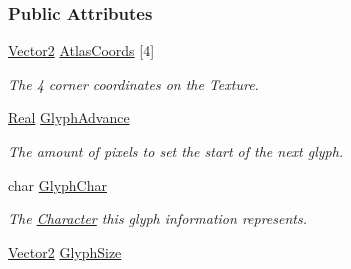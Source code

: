 \subsubsection*{Public Attributes}
\begin{DoxyCompactItemize}
\item 
\hypertarget{classMezzanine_1_1UI_1_1Glyph_ad4c8240173295f6ebb23dcab2c04ea94}{
\hyperlink{classMezzanine_1_1Vector2}{Vector2} \hyperlink{classMezzanine_1_1UI_1_1Glyph_ad4c8240173295f6ebb23dcab2c04ea94}{AtlasCoords} \mbox{[}4\mbox{]}}
\label{classMezzanine_1_1UI_1_1Glyph_ad4c8240173295f6ebb23dcab2c04ea94}

\begin{DoxyCompactList}\small\item\em The 4 corner coordinates on the Texture. \item\end{DoxyCompactList}\item 
\hypertarget{classMezzanine_1_1UI_1_1Glyph_a5bca9d6333cf67a842546475f350a4ec}{
\hyperlink{namespaceMezzanine_a726731b1a7df72bf3583e4a97282c6f6}{Real} \hyperlink{classMezzanine_1_1UI_1_1Glyph_a5bca9d6333cf67a842546475f350a4ec}{GlyphAdvance}}
\label{classMezzanine_1_1UI_1_1Glyph_a5bca9d6333cf67a842546475f350a4ec}

\begin{DoxyCompactList}\small\item\em The amount of pixels to set the start of the next glyph. \item\end{DoxyCompactList}\item 
\hypertarget{classMezzanine_1_1UI_1_1Glyph_a0573fd5b023ccb16bb30006e16814b60}{
char \hyperlink{classMezzanine_1_1UI_1_1Glyph_a0573fd5b023ccb16bb30006e16814b60}{GlyphChar}}
\label{classMezzanine_1_1UI_1_1Glyph_a0573fd5b023ccb16bb30006e16814b60}

\begin{DoxyCompactList}\small\item\em The \hyperlink{structMezzanine_1_1UI_1_1Character}{Character} this glyph information represents. \item\end{DoxyCompactList}\item 
\hypertarget{classMezzanine_1_1UI_1_1Glyph_a308db46cfad68fc682c4e3f16edbd1cb}{
\hyperlink{classMezzanine_1_1Vector2}{Vector2} \hyperlink{classMezzanine_1_1UI_1_1Glyph_a308db46cfad68fc682c4e3f16edbd1cb}{GlyphSize}}
\label{classMezzanine_1_1UI_1_1Glyph_a308db46cfad68fc682c4e3f16edbd1cb}


\end{DoxyCompactItemize}
